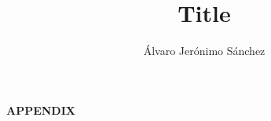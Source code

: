 \documentclass[]{scrartcl}
\title{\vspace{-1.8cm} Title}
\author{Álvaro Jerónimo Sánchez}
\date{}
\begin{document}
\maketitle
\setcounter{section}{0}
\renewcommand{\tablename}{Tabla}


\nocite{*}
\printbibliography

\appendix
\textbf{APPENDIX}
\end{document}
